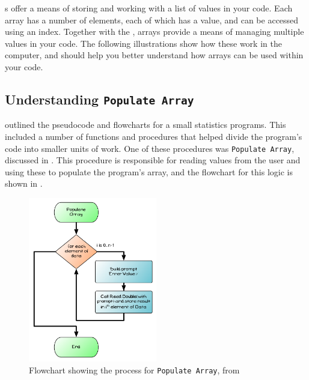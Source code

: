 s offer a means of storing and working with a list of values in your code. Each array has a number of elements, each of which has a value, and can be accessed using an index. Together with the , arrays provide a means of managing multiple values in your code. The following illustrations show how these work in the computer, and should help you better understand how arrays can be used within your code.

\subsection{Understanding \texttt{Populate Array}} %
\label{sub:understanding_populate_array}

  outlined the pseudocode and flowcharts for a small statistics programs. This included a number of functions and procedures that helped divide the program's code into smaller units of work. One of these procedures was \texttt{Populate Array}, discussed in  . This procedure is responsible for reading values from the user and using these to populate the program's array, and the flowchart for this logic is shown in .

\begin{figure}[htbp]
   \centering
   \includegraphics[width=0.5\textwidth]{./topics/arrays/diagrams/PopulateArray} 
   \caption{Flowchart showing the process for \texttt{Populate Array}, from }
   \label{fig:populate-array-flow-understanding}
\end{figure}

